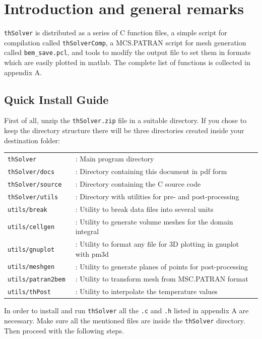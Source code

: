 \documentclass[12pt]{article}
\begin{document}
\tableofcontents
\pagebreak

\section{Introduction and general remarks}
\verb+thSolver+ is distributed as a series of C function files, a simple script for compilation called \verb+thSolverComp+, a MCS.PATRAN script for mesh generation called \verb+bem_save.pcl+, and tools to modify the output file to set them in formats which are easily plotted in matlab. The complete list of functions is collected in appendix A.

\subsection{Quick Install Guide}
First of all, unzip the \verb+thSolver.zip+ file in a suitable directory. If you chose to keep the directory structure there will be three directories created inside your destination folder:

\begin{tabular}{ll}
\texttt{thSolver}&: Main program directory\\
\texttt{thSolver/docs}&: Directory containing this document in pdf form\\
\texttt{thSolver/source}&: Directory containing the C source code\\
\texttt{thSolver/utils}&: Directory with utilities for pre- and post-processing\\
\texttt{utils/break}&: Utility to break data files into several units\\
\texttt{utils/cellgen}&: Utility to generate volume meshes for the domain integral\\
\texttt{utils/gnuplot}&: Utility to format any file for 3D plotting in gnuplot with pm3d\\
\texttt{utils/meshgen}&: Utility to generate planes of points for post-processing\\
\texttt{utils/patran2bem }&: Utility to transform mesh from MSC.PATRAN format\\
\texttt{utils/thPost}&: Utility to interpolate the temperature values
\end{tabular}

In order to install and run \verb+thSolver+ all the \verb+.c+ and \verb+.h+ listed in appendix A are necessary. Make sure all the mentioned files are inside the \verb+thSolver+ directory. Then proceed with the following steps.
\end{document}
